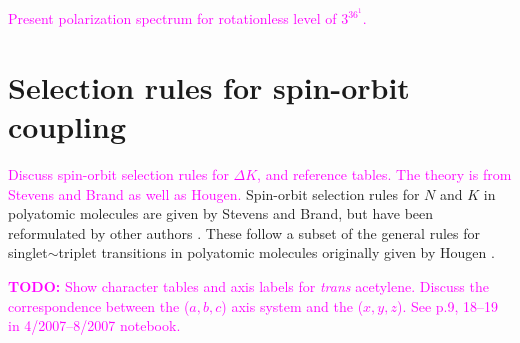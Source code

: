 \documentclass[12pt,draft]{mitthesis}
\newcommand{\TODO} [1]{\textcolor{magenta}{\textbf{TODO:} #1}}
\newcommand{\POINT}[1]{\textcolor{magenta}{#1}}
\begin{document}
\POINT{Present polarization spectrum for rotationless level of
  $3^36^1$.}

\section{Selection rules for spin-orbit coupling}

\POINT{Discuss spin-orbit selection rules for $\Delta K$, and
  reference tables.  The theory is from Stevens and Brand as well as
  Hougen.}  Spin-orbit selection rules for $N$ and $K$ in polyatomic
molecules are given by Stevens and Brand, but have been reformulated
by other authors \cite{stevens73, howard78, dupre84}.  These follow a
subset of the general rules for singlet$\sim$triplet transitions in
polyatomic molecules originally given by Hougen \cite{hougen64}.



\TODO{Show character tables and axis labels for \emph{trans}
  acetylene.  Discuss the correspondence between the ($a,b,c$) axis
  system and the ($x,y,z$).  See p.9, 18--19 in 4/2007--8/2007 notebook.}
\end{document}

